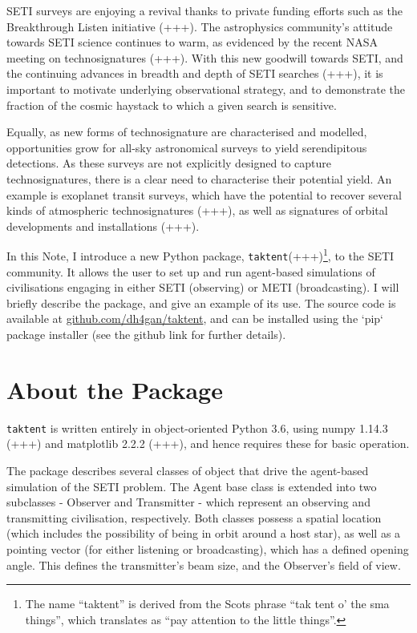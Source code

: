 \documentclass[RNAAS]{aastex62}
\begin{document}
SETI surveys are enjoying a revival thanks to private funding efforts such as the Breakthrough Listen initiative (+++).  The astrophysics community's attitude towards SETI science continues to warm, as evidenced by the recent NASA meeting on technosignatures (+++).   With this new goodwill towards SETI, and the continuing advances in breadth and depth of SETI searches (+++), it is important to motivate underlying observational strategy, and to demonstrate the fraction of the cosmic haystack to which a given search is sensitive.  

Equally, as new forms of technosignature are characterised and modelled, opportunities grow for all-sky astronomical surveys to yield serendipitous detections.  As these surveys are not explicitly designed to capture technosignatures, there is a clear need to characterise their potential yield.  An example is exoplanet transit surveys, which have the potential to recover several kinds of atmospheric technosignatures (+++), as well as signatures of orbital developments and installations \citep{asteroid_mining}(+++).

In this Note, I introduce a new Python package, \texttt{taktent}(+++)\footnote{The name ``taktent'' is derived from the Scots phrase ``tak tent o' the sma things'', which translates as ``pay attention to the little things''.}, to the SETI community.  It allows the user to set up and run agent-based simulations of civilisations engaging in either SETI (observing) or METI (broadcasting).  I will briefly describe the package, and give an example of its use.  The source code is available at \url{github.com/dh4gan/taktent}, and can be installed using the `pip` package installer (see the github link for further details).

\section{About the Package}

\noindent \texttt{taktent} is written entirely in object-oriented Python 3.6, using numpy 1.14.3 (+++) and matplotlib 2.2.2 (+++), and hence requires these for basic operation.  

The package describes several classes of object that drive the agent-based simulation of the SETI problem.  The Agent base class is extended into two subclasses - Observer and Transmitter - which represent an observing and transmitting civilisation, respectively.  Both classes possess a spatial location (which includes the possibility of being in orbit around a host star), as well as a pointing vector (for either listening or broadcasting), which has a defined opening angle.  This defines the transmitter's beam size, and the Observer's field of view.
\end{document}
